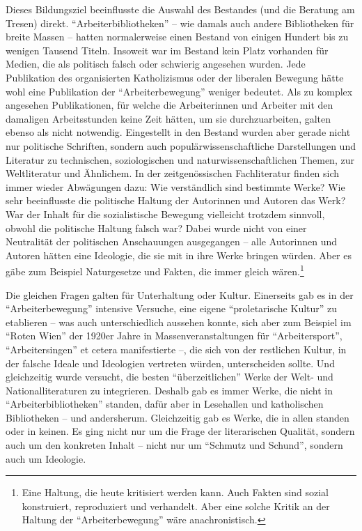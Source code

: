 \documentclass[a4paper,
fontsize=11pt,
oneside,
numbers=noperiodatend,
parskip=half-,
bibliography=totoc,
final
]{scrartcl}
\begin{document}
Dieses Bildungsziel beeinflusste die Auswahl des Bestandes (und die
Beratung am Tresen) direkt. \enquote{Arbeiterbibliotheken} -- wie damals
auch andere Bibliotheken für breite Massen -- hatten normalerweise einen
Bestand von einigen Hundert bis zu wenigen Tausend Titeln. Insoweit war
im Bestand kein Platz vorhanden für Medien, die als politisch falsch
oder schwierig angesehen wurden. Jede Publikation des organisierten
Katholizismus oder der liberalen Bewegung hätte wohl eine Publikation
der \enquote{Arbeiterbewegung} weniger bedeutet. Als zu komplex
angesehen Publikationen, für welche die Arbeiterinnen und Arbeiter mit
den damaligen Arbeitsstunden keine Zeit hätten, um sie durchzuarbeiten,
galten ebenso als nicht notwendig. Eingestellt in den Bestand wurden
aber gerade nicht nur politische Schriften, sondern auch
populärwissenschaftliche Darstellungen und Literatur zu technischen,
soziologischen und naturwissenschaftlichen Themen, zur Weltliteratur und
Ähnlichem. In der zeitgenössischen Fachliteratur finden sich immer
wieder Abwägungen dazu: Wie verständlich sind bestimmte Werke? Wie sehr
beeinflusste die politische Haltung der Autorinnen und Autoren das Werk?
War der Inhalt für die sozialistische Bewegung vielleicht trotzdem
sinnvoll, obwohl die politische Haltung falsch war? Dabei wurde nicht
von einer Neutralität der politischen Anschauungen ausgegangen -- alle
Autorinnen und Autoren hätten eine Ideologie, die sie mit in ihre Werke
bringen würden. Aber es gäbe zum Beispiel Naturgesetze und Fakten, die
immer gleich wären.\footnote{Eine Haltung, die heute kritisiert werden
  kann. Auch Fakten sind sozial konstruiert, reproduziert und
  verhandelt. Aber eine solche Kritik an der Haltung der
  \enquote{Arbeiterbewegung} wäre anachronistisch.}

Die gleichen Fragen galten für Unterhaltung oder Kultur. Einerseits gab
es in der \enquote{Arbeiterbewegung} intensive Versuche, eine eigene
\enquote{proletarische Kultur} zu etablieren -- was auch unterschiedlich
aussehen konnte, sich aber zum Beispiel im \enquote{Roten Wien} der
1920er Jahre in Massenveranstaltungen für \enquote{Arbeitersport},
\enquote{Arbeitersingen} et cetera manifestierte --, die sich von der
restlichen Kultur, in der falsche Ideale und Ideologien vertreten
würden, unterscheiden sollte. Und gleichzeitig wurde versucht, die
besten \enquote{überzeitlichen} Werke der Welt- und Nationalliteraturen
zu integrieren. Deshalb gab es immer Werke, die nicht in
\enquote{Arbeiterbibliotheken} standen, dafür aber in Lesehallen und
katholischen Bibliotheken -- und andersherum. Gleichzeitig gab es Werke,
die in allen standen oder in keinen. Es ging nicht nur um die Frage der
literarischen Qualität, sondern auch um den konkreten Inhalt -- nicht
nur um \enquote{Schmutz und Schund}, sondern auch um Ideologie.
\end{document}
